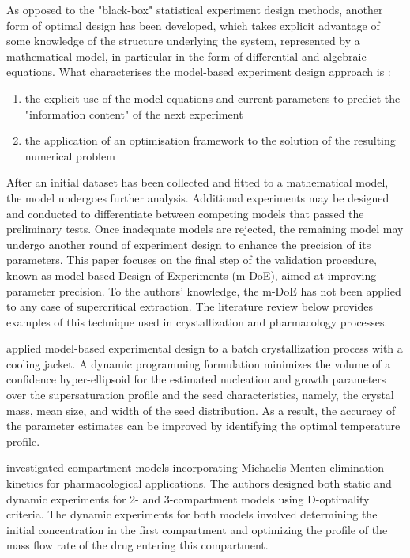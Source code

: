 \documentclass[../Article_Sensitivity_Analsysis.tex]{subfiles}
\begin{document}
	As opposed to the "black-box" statistical experiment design methods, another form of optimal design has been developed, which takes explicit advantage of some knowledge of the structure underlying the system, represented by a mathematical model, in particular in the form of differential and algebraic equations. What characterises the model-based experiment design approach is :
	
	\begin{enumerate}
		\item the explicit use of the model equations and current parameters to predict the "information content" of the next experiment
		\item the application of an optimisation framework to the solution of the resulting numerical problem
	\end{enumerate}
	
	After an initial dataset has been collected and fitted to a mathematical model, the model undergoes further analysis. Additional experiments may be designed and conducted to differentiate between competing models that passed the preliminary tests. Once inadequate models are rejected, the remaining model may undergo another round of experiment design to enhance the precision of its parameters. This paper focuses on the final step of the validation procedure, known as model-based Design of Experiments (m-DoE), aimed at improving parameter precision. To the authors' knowledge, the m-DoE has not been applied to any case of supercritical extraction. The literature review below provides examples of this technique used in crystallization and pharmacology processes.
	
	\citet{Chung2000} applied model-based experimental design to a batch crystallization process with a cooling jacket. A dynamic programming formulation minimizes the volume of a confidence hyper-ellipsoid for the estimated nucleation and growth parameters over the supersaturation profile and the seed characteristics, namely, the crystal mass, mean size, and width of the seed distribution. As a result, the accuracy of the parameter estimates can be improved by identifying the optimal temperature profile.
	
	\citet{Duarte2019} investigated compartment models incorporating Michaelis-Menten elimination kinetics for pharmacological applications. The authors designed both static and dynamic experiments for 2- and 3-compartment models using D-optimality criteria. The dynamic experiments for both models involved determining the initial concentration in the first compartment and optimizing the profile of the mass flow rate of the drug entering this compartment.
	
\end{document}
